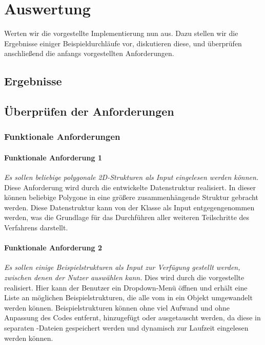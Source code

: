 %
\chapter{Auswertung}
\label{chap:auswertung}
Werten wir die vorgestellte Implementierung nun aus. Dazu stellen wir die Ergebnisse einiger Beispieldurchläufe vor, diskutieren diese, und überprüfen
anschließend die anfangs vorgestellten Anforderungen.

\section{Ergebnisse}

\section{Überprüfen der Anforderungen}
\subsection{Funktionale Anforderungen}
\subsubsection{Funktionale Anforderung 1}
\textit{Es sollen beliebige polygonale 2D-Strukturen als Input eingelesen werden können.} Diese Anforderung wird
durch die entwickelte  Datenstruktur realisiert. In dieser können beliebige Polygone in eine größere zusammenhängende
Struktur gebracht werden. Diese Datenstruktur kann von der  Klasse als Input entgegengenommen werden, was die
Grundlage für das Durchführen aller weiteren Teilschritte des Verfahrens darstellt.

\subsubsection{Funktionale Anforderung 2}
\textit{Es sollen einige Beispielstrukturen als Input zur Verfügung gestellt werden, zwischen denen der Nutzer auswählen kann.}
Dies wird durch die vorgestellte  realisiert. Hier kann der Benutzer ein Dropdown-Menü öffnen und erhält eine Liste an
möglichen Beispielstrukturen, die alle vom  in ein  Objekt umgewandelt werden können.
Beispielstrukturen können ohne viel Aufwand und ohne Anpassung des Codes entfernt, hinzugefügt oder ausgetauscht werden, da diese in
separaten -Dateien gespeichert werden und dynamisch zur Laufzeit eingelesen werden können.

